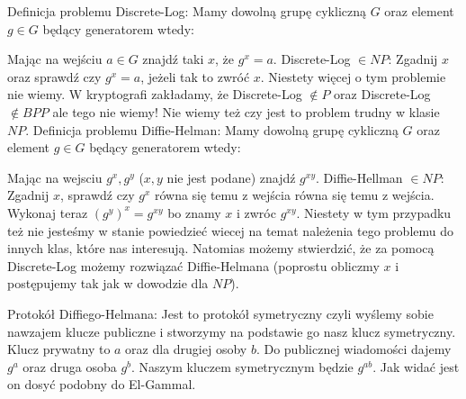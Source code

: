 Definicja problemu Discrete-Log:\newline
Mamy dowolną grupę cykliczną $G$ oraz element $g \in G$ będący generatorem wtedy:\newline \newline

Mając na wejściu $a \in G$ znajdź taki $x$, że $g^x = a$.
\newline \newline
Discrete-Log $\in NP$:\newline
Zgadnij $x$ oraz sprawdź czy $g^x = a$, jeżeli tak to zwróć $x$.
\newline \newline
Niestety więcej o tym problemie nie wiemy. W kryptografi zakładamy, że Discrete-Log $\notin P$ oraz Discrete-Log $\notin BPP$ ale tego nie wiemy! Nie wiemy też czy jest to problem trudny w klasie $NP$.
\newline \newline
Definicja problemu Diffie-Helman:
Mamy dowolną grupę cykliczną $G$ oraz element $g \in G$ będący generatorem wtedy:\newline \newline

Mając na wejsciu $g^x,g^y$ ($x,y$ nie jest podane) znajdź $g^{xy}$.
\newline \newline
Diffie-Hellman $\in NP$:\newline
Zgadnij $x$, sprawdź czy $g^x$ równa się temu z wejścia równa się temu z wejścia. Wykonaj teraz $(g^{y})^x = g^{xy}$ bo znamy $x$ i zwróc $g^{xy}$.
\newline \newline
Niestety w tym przypadku też nie jesteśmy w stanie powiedzieć wiecej na temat należenia tego problemu do innych klas, które nas interesują. Natomias możemy stwierdzić, że za pomocą Discrete-Log możemy rozwiązać Diffie-Helmana (poprostu obliczmy $x$ i postępujemy tak jak w dowodzie dla $NP$).

Protokół Diffiego-Helmana:\newline
Jest to protokół symetryczny czyli wyślemy sobie nawzajem klucze publiczne i stworzymy na podstawie go nasz klucz symetryczny. Klucz prywatny to $a$ oraz dla drugiej osoby $b$. Do publicznej wiadomości dajemy $g^a$ oraz druga osoba $g^b$. Naszym kluczem symetrycznym będzie $g^{ab}$. Jak widać jest on dosyć podobny do El-Gammal.